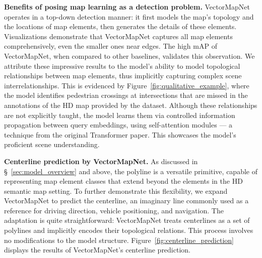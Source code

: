 \documentclass{article}
\theoremstyle{plain}
\theoremstyle{definition}
\theoremstyle{remark}
\begin{document}
\noindent\textbf{Benefits of posing map learning as a detection problem.}
VectorMapNet operates in a top-down detection manner: it first models the map's topology and the locations of map elements, then generates the details of these elements. Visualizations demonstrate that VectorMapNet captures all map elements comprehensively, even the smaller ones near edges. The high mAP of VectorMapNet, when compared to other baselines, validates this observation. We attribute these impressive results to the model's ability to model topological relationships between map elements, thus implicitly capturing complex scene interrelationships. This is evidenced by Figure~\ref{fig:qualitative_example}, where the model identifies pedestrian crossings at intersections that are missed in the annotations of the HD map provided by the dataset. Although these relationships are not explicitly taught, the model learns them via controlled information propagation between query embeddings, using self-attention modules — a technique from the original Transformer paper. This showcases the model's proficient scene understanding.

\noindent\textbf{Centerline prediction by VectorMapNet.}
As discussed in \S~\ref{sec:model_overview} and above, the polyline is a versatile primitive, capable of representing map element classes that extend beyond the elements in the HD semantic map setting. To further demonstrate this flexibility, we expand VectorMapNet to predict the centerline, an imaginary line commonly used as a reference for driving direction, vehicle positioning, and navigation. The adaptation is quite straightforward: VectorMapNet treats centerlines as a set of polylines and implicitly encodes their topological relations. This process involves no modifications to the model structure. Figure~\ref{fig:centerline_prediction} displays the results of VectorMapNet's centerline prediction. 
\end{document}
